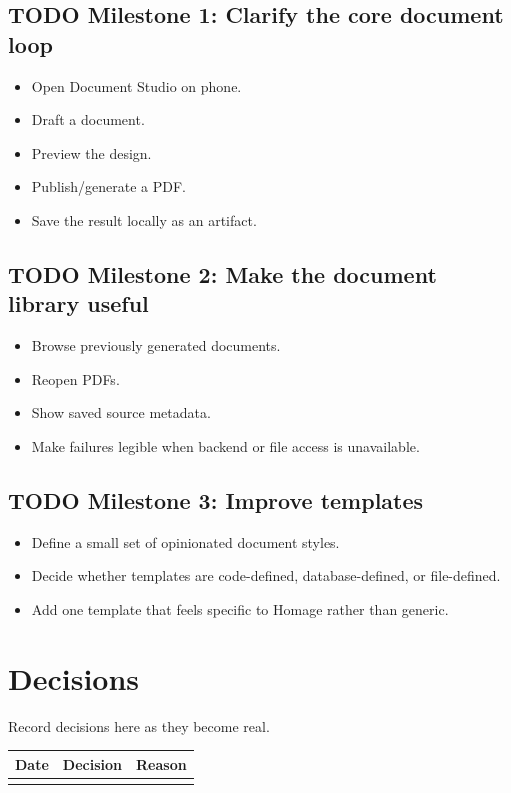 \documentclass[11pt]{article}
\begin{document}
\subsection{{\bfseries\sffamily TODO} Milestone 1: Clarify the core document loop}
\label{sec:org4c1dbc7}

\begin{itemize}
\item Open Document Studio on phone.
\item Draft a document.
\item Preview the design.
\item Publish/generate a PDF.
\item Save the result locally as an artifact.
\end{itemize}
\subsection{{\bfseries\sffamily TODO} Milestone 2: Make the document library useful}
\label{sec:org1b33f13}

\begin{itemize}
\item Browse previously generated documents.
\item Reopen PDFs.
\item Show saved source metadata.
\item Make failures legible when backend or file access is unavailable.
\end{itemize}
\subsection{{\bfseries\sffamily TODO} Milestone 3: Improve templates}
\label{sec:org62319d0}

\begin{itemize}
\item Define a small set of opinionated document styles.
\item Decide whether templates are code-defined, database-defined, or file-defined.
\item Add one template that feels specific to Homage rather than generic.
\end{itemize}
\section{Decisions}
\label{sec:org08b8bb5}

Record decisions here as they become real.

\begin{center}
\begin{tabular}{lll}
Date & Decision & Reason\\
\hline
 &  & \\
\end{tabular}
\end{center}
\end{document}
